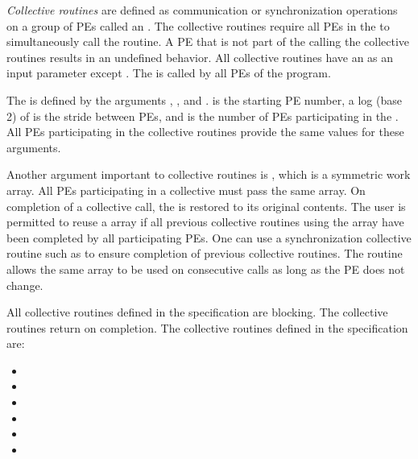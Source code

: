 \emph{Collective routines} are defined as communication or synchronization
operations on a group of \acp{PE} called an \activeset. The collective
routines require all \acp{PE} in the \activeset to simultaneously call the
routine.  A \ac{PE} that is not part of the \activeset calling the collective
routines results in an undefined behavior.  All collective routines have an
\activeset as an input parameter except \barrierall. The \barrierall is
called by all \acp{PE} of the \openshmem program. 

The \activeset is defined by the arguments , ,
and .   is the starting \ac{PE} number, a log (base
2) of  is the stride between \acp{PE}, and  is
the number of \acp{PE} participating in the \activeset.  All \acp{PE}
participating in the collective routines provide the same values for these
arguments. 
 
Another argument important to collective routines is , which is a
symmetric work array.  All \acp{PE} participating in a collective must pass the
same  array.  On completion of a collective call, the  is
restored to its original contents.  The user is permitted to reuse a 
array if all previous collective routines using the  array have been
completed by all participating \acp{PE}.  One can use a synchronization
collective routine such as \barrier to ensure completion of previous collective
routines. The  routine allows the same  array to
be used on consecutive calls as long as the \ac{PE} \activeset does not change. 

All collective routines defined in the specification are blocking.  The
collective routines return on completion.  The collective routines defined in
the \openshmem specification are:

\begin{itemize}
\item[] \broadcast 
\item[] \barrier
\item[] \barrierall
\item[] \collect
\item[] \reduction
\item[] 
\end{itemize} 

